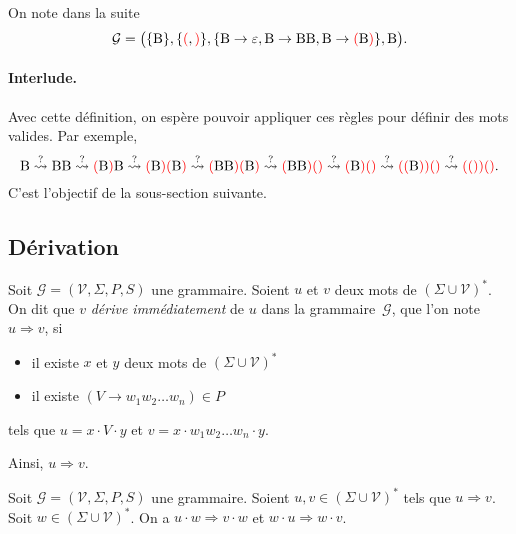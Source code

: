 \begin{exm}
	On note dans la suite \[
		\mathcal{G} = \big(\{\mathrm{B}\}, \{\mathord{{\color{red}(}},\mathord{{\color{red})}}\}, \{\mathrm{B}\to \varepsilon,\mathrm{B}\to \mathrm{BB},\mathrm{B}\to \mathord{{\color{red}(}} \mathrm{B}\mathord{{\color{red})}}\}, \mathrm{B}\big)
	.\]
\end{exm}

\paragraph{Interlude.}
Avec cette définition, on espère pouvoir appliquer ces règles pour définir des mots valides. Par exemple,
\[
	\mathrm{B} \overset?\leadsto \mathrm{BB} \overset?\leadsto {\color{red}(}\mathrm{B}{\color{red})} \mathrm{B} \overset?\leadsto {\color{red}(}\mathrm{B}{\color{red})}{\color{red}(}\mathrm{B}{\color{red})} \overset?\leadsto {\color{red}(}\mathrm{BB}{\color{red})} {\color{red}(}\mathrm{B}{\color{red})} \overset?\leadsto {\color{red}(}\mathrm{BB}{\color{red})}{\color{red}(}{\color{red})} \overset?\leadsto
	{\color{red}(}\mathrm{B}{\color{red})}{\color{red}(}{\color{red})} \overset?\leadsto {\color{red}(}{\color{red}(}\mathrm{B}{\color{red})}{\color{red})}{\color{red}(}{\color{red})} \overset?\leadsto{\color{red}(())()}
.\]
C'est l'objectif de la sous-section suivante.

\subsection{Dérivation}

\begin{defn}
	Soit $\mathcal{G} = (\mathcal{V}, \Sigma, P, S)$ une grammaire. Soient $u$ et $v$ deux mots de $(\Sigma \cup \mathcal{V})^*$.
	On dit que $v$ \textit{dérive immédiatement} de $u$ dans la grammaire~$\mathcal{G}$, que l'on note $u \Rightarrow v$, si
	\begin{itemize}
		\item il existe $x$ et $y$ deux mots de $(\Sigma \cup \mathcal{V})^*$
		\item il existe $(V \to w_1 w_2 \ldots w_n) \in P$
	\end{itemize}
	tels que $u = x \cdot V \cdot y$ et $v = x \cdot w_1 w_2 \ldots w_n \cdot y$.
\end{defn}

\begin{exm}
	Ainsi, $u \Rightarrow v$.
\end{exm}

\begin{lem}[de composition]
	Soit $\mathcal{G} = (\mathcal{V}, \Sigma, P, S)$ une grammaire.
	Soient $u, v \in (\Sigma \cup \mathcal{V})^*$ tels que $u \Rightarrow v$.
	Soit $w \in (\Sigma \cup \mathcal{V})^*$.
	On a $u\cdot w \Rightarrow v \cdot w$ et $w\cdot u\Rightarrow w \cdot v$.
\end{lem}

